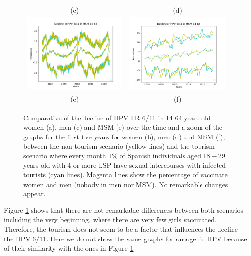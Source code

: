 \begin{figure}[!]
\begin{tabular}{cc}
		(c)	& (d) \\ 		
		\includegraphics[width=0.5\linewidth]{IMGs/8.-Turismo/verr_MSM.pdf}	& 
		\includegraphics[width=0.5\linewidth]{IMGs/8.-Turismo/verr_MSM_ZOOM.pdf}  \\ 
		(e)	& (f)
 	\end{tabular} 
	\caption{Comparative of the decline of  HPV LR 6/11 in 14-64 years old women (a), men (c) and MSM (e) over the time and a zoom of the graphs for the first five years for women (b), men (d) and MSM (f), between the non-tourism scenario (yellow lines) and the tourism scenario where every month $1\%$ of Spanish individuals aged $18-29$ years old with $4$ or more LSP have sexual intercourses with infected tourists (cyan lines). Magenta lines show the percentage of vaccinate women and men (nobody in men nor MSM). No remarkable changes appear.}
	\label{fig:turismo}
\end{figure}

Figure \ref{fig:turismo} shows that there are not remarkable differences between both scenarios including the very beginning, where there are very few girls vaccinated. Therefore, the tourism does not seem to be a factor that influences the decline the HPV 6/11. Here we do not show the same graphs for oncogenic HPV because of their similarity with the ones in Figure \ref{fig:turismo}. 

